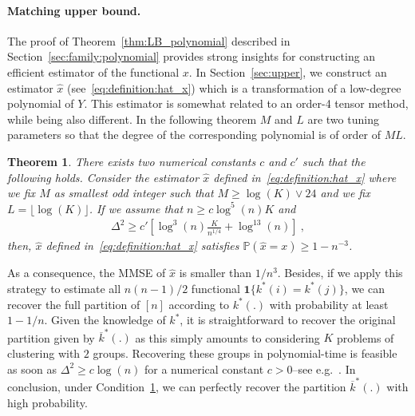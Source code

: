 \documentclass{article}
\newcommand{\pa}[1]{\left(#1\right)}
\newcommand{\nico}[1]{\textcolor{magenta}{[Nicolas: #1]}}
\newtheorem{theorem}{Theorem}
\begin{document}


\paragraph{Matching upper bound.} The proof of Theorem~\ref{thm:LB_polynomial} described in Section~\ref{sec:family:polynomial} provides strong insights for constructing an efficient estimator of the functional $x$. In Section~\ref{sec:upper}, we construct an estimator $\hat{x}$  (see~\eqref{eq:definition:hat_x}) which is a transformation  of a low-degree polynomial of $Y$. This estimator is somewhat related to an order-4 tensor method, while being also different. In the following theorem $M$ and $L$ are two tuning parameters so that the degree of the corresponding polynomial is of order of $ML$. 



\begin{theorem}\label{thm:final_upper_bound}
    There exists two numerical constants $c$ and $c'$ such that the following holds. Consider the estimator $\hat{x}$ defined in~\eqref{eq:definition:hat_x} where 
    we fix $M$ as smallest odd integer such that $M\geq \log(K) \vee 24$ and we fix $L= \lfloor \log(K)\rfloor$.  If we assume that $n \geq c \log^{5}(n) K$ and 
\begin{align}\label{eq:condition:final_upper_bound}
    \Delta^2 \geq c' \left[\log^{3}(n)\frac{K}{n^{1/4}} + \log^{13} (n) \right] \ , 
\end{align}
then, $\hat{x}$ defined in~\eqref{eq:definition:hat_x} satisfies $\mathbb{P}\pa{\hat x=x}\geq 1-n^{-3}$. 
\end{theorem}



As a consequence, the MMSE of $\hat{x}$ is smaller than $1/n^3$. Besides, if we apply this strategy to estimate all $n(n-1)/2$ functional $\mathbf{1}\{k^*(i)= k^*(j)\}$, we can recover the full partition of $[n]$ according to $k^*(.)$ with probability at least $1-1/n$. Given the knowledge of $k^*$, it is straightforward to recover the original partition given by $\overline{k}^*(.)$ as this simply amounts to considering $K$ problems of clustering with $2$ groups. Recovering these groups in polynomial-time is feasible as soon as  $\Delta^2\geq c\log(n)$ for a numerical constant $c>0$--see e.g.~\cite{ndaoud2022sharp}. In conclusion, under Condition~\ref{thm:final_upper_bound}, we can perfectly recover the partition $\overline{k}^*(.)$ with high probability. 
\end{document}
